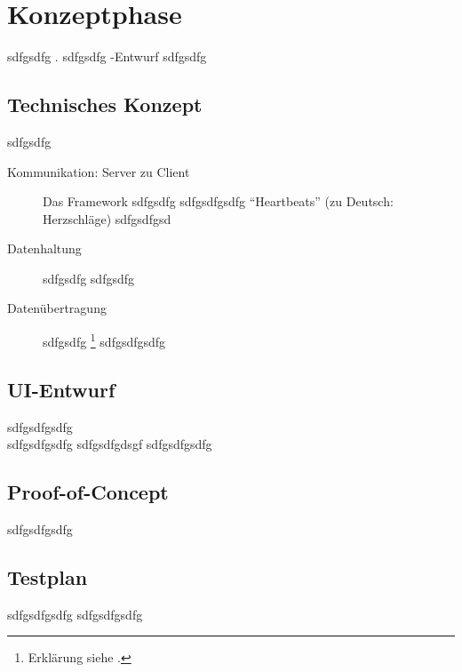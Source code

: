 \section{Konzeptphase}
\label{sec:Konzeptphase}
sdfgsdfg . sdfgsdfg -Entwurf sdfgsdfg

\subsection{Technisches Konzept}
\label{sub:Technisches Konzept}
sdfgsdfg

\begin{description}
    \item [Kommunikation: Server zu Client]
    Das Framework  sdfgsdfg \zB sdfgsdfgsdfg \sog "`Heartbeats"' (zu Deutsch: Herzschläge) sdfgsdfgsd
    \item [Datenhaltung]
    sdfgsdfg  sdfgsdfg
    \item [Datenübertragung]
    sdfgsdfg \footnote{Erklärung siehe .} sdfgsdfgsdfg
\end{description}

\subsection{UI-Entwurf}
\label{sub:UI-Entwurf}
sdfgsdfgsdfg\\
sdfgsdfgsdfg  sdfgsdfgdsgf  sdfgsdfgsdfg

\subsection{Proof-of-Concept}
\label{sub:Proof-of-Concept}
sdfgsdfgsdfg

\subsection{Testplan}
\label{sub:Testplan}
sdfgsdfgsdfg  sdfgsdfgsdfg

